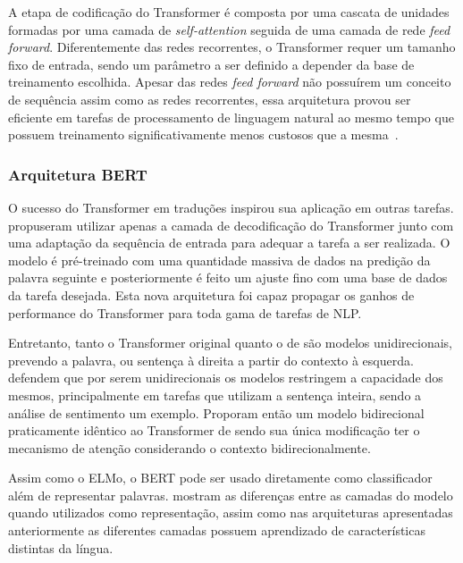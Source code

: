 
A etapa de codificação do Transformer é composta por uma cascata de unidades
formadas por uma camada de \textit{self-attention} seguida de uma camada de
rede \textit{feed forward}.
Diferentemente das redes recorrentes, o Transformer requer um tamanho fixo de
entrada, sendo um parâmetro a ser definido a depender da base de treinamento
escolhida.
Apesar das redes \textit{feed forward} não possuírem um conceito de sequência
assim como as redes recorrentes, essa arquitetura provou ser eficiente em
tarefas de processamento de linguagem natural ao mesmo tempo que possuem
treinamento significativamente menos custosos que a mesma~\cite{vaswani17}.

\subsubsection{Arquitetura BERT}

O sucesso do Transformer em traduções inspirou sua aplicação em outras tarefas.
\citet{radford18} propuseram utilizar apenas a camada de decodificação do
Transformer junto com uma adaptação da sequência de entrada para adequar a
tarefa a ser realizada.
O modelo é pré-treinado com uma quantidade massiva de dados na predição da
palavra seguinte e posteriormente é feito um ajuste fino com uma base de dados
da tarefa desejada.
Esta nova arquitetura foi capaz propagar os ganhos de performance do Transformer
para toda gama de tarefas de NLP.

Entretanto, tanto o Transformer original quanto o de \citet{radford18} são
modelos unidirecionais, prevendo a palavra, ou sentença à direita a partir do
contexto à esquerda.
\citet{devlin18} defendem que por serem unidirecionais os modelos restringem a
capacidade dos mesmos, principalmente em tarefas que utilizam a sentença
inteira, sendo a análise de sentimento um exemplo.
Proporam então um modelo bidirecional praticamente idêntico ao Transformer de
\citet{radford18} sendo sua única modificação ter o mecanismo de atenção
considerando o contexto bidirecionalmente.

Assim como o ELMo, o BERT pode ser usado diretamente como classificador além de
representar palavras.
\citet{devlin18} mostram as diferenças entre as camadas do modelo quando
utilizados como representação, assim como nas arquiteturas apresentadas
anteriormente as diferentes camadas possuem aprendizado de características
distintas da língua.

